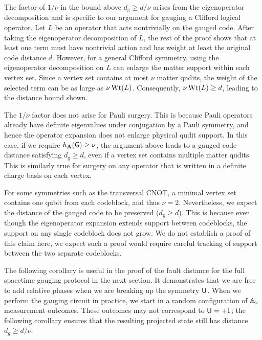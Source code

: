 \documentclass[11pt]{article}
\begin{document}
\begin{remark}
    The factor of $1/\nu$ in the bound above $d_\mathrm{g}\ge d/\nu$ arises from the eigenoperator decomposition and is specific to our argument for gauging a Clifford logical operator.
    Let $L$ be an operator that acts nontrivially on the gauged code. 
    After taking the eigenoperator decomposition of $L$, the rest of the proof shows that at least one term must have nontrivial action and has weight at least the original code distance $d$.
    However, for a general Clifford symmetry, using the eigenoperator decomposition on $L$ can enlarge the matter support within each vertex set.
    Since a vertex set contains at most $\nu$ matter qudits, the weight of the selected term can be as large as $\nu\operatorname{Wt}(L)$. Consequently, $\nu\operatorname{Wt}(L)\ge d$, leading to the distance bound shown.

    \vspace{6pt}
    The $1/\nu$ factor does not arise for Pauli surgery.
    This is because Pauli operators already have definite eigenvalues under conjugation by a Pauli symmetry, and hence the operator expansion does not enlarge physical qudit support. In this case, if we require $h_{\mathbf{A}}(\mathsf{G}) \geq \nu $, the argument above leads to a gauged code distance satisfying $d_\mathrm{g}\ge d$, even if a vertex set contains multiple matter qudits. This is similarly true for surgery on any operator that is written in a definite charge basis on each vertex.
\end{remark}

\begin{remark}
    For some symmetries such as the transversal CNOT, a minimal vertex set contains one qubit from each codeblock, and thus $\nu=2$. 
    Nevertheless, we expect the distance of the gauged code to be preserved ($d_\mathrm{g}\ge d$). This is because even though the eigenoperator expansion extends support between codeblocks, the support on any single codeblock does not grow. We do not establish a proof of this claim here, we expect such a proof would require careful tracking of support between the two separate codeblocks.
\end{remark}

The following corollary is useful in the proof of the fault distance for the full spacetime gauging protocol in the next section. It demonstrates that we are free to add relative phases when we are breaking up the symmetry $\mathsf{U}$. When we perform the gauging circuit in practice, we start in a random configuration of $\mathbb{A}_v$ measurement outcomes. These outcomes may not correspond to $\mathsf{U} = +1$; the following corollary ensures that the resulting projected state still has distance $d_g\geq d/\nu$.
\end{document}
